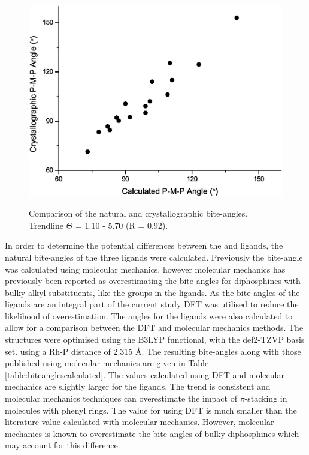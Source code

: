 \begin{figure}[htb]
\begin{center}
\vspace{0.5cm}
\includegraphics[width=\textwidth]{../Figures/Biteanglegraphorigin.eps}
\caption[Comparison of the natural and crystallographic bite-angles]{Comparison of the natural and crystallographic bite-angles.  Trendline $\Theta$ = 1.10 \natbiteangle - 5.70 (R = 0.92).}
\vspace{0.2cm}
\label{Biteanglegraph}
\end{center}
\end{figure}
\vspace{0.2cm}

In order to determine the potential differences between the \tBuxantphos{} and \Phxantphos{} ligands, the natural bite-angles of the three \tBuxantphos{} ligands were calculated.  Previously the \tBuxantphos{} bite-angle was calculated using molecular mechanics, however molecular mechanics has previously been reported as overestimating the bite-angles for diphosphines with bulky alkyl substituents, like the \tBu{} groups in the \tBuxantphos{} ligands.\cite{Dierkes1999}  As the bite-angles of the \tBuxantphos{} ligands are an integral part of the current study \gls{DFT} was utilised to reduce the likelihood of overestimation.  The angles for the \Phxantphos{} ligands were also calculated to allow for a comparison between the \gls{DFT} and molecular mechanics methods.  The structures were optimised using the B3LYP functional,\cite{Becke1993, Lee1988, Vosko1980, Stephens1994} with the def2-TZVP basis set.\cite{Andrae1990, Weigend2005} using a Rh-P distance of 2.315 \si{\angstrom}.  The resulting bite-angles along with those published using molecular mechanics are given in Table \ref{table:biteanglescalculated}.  The values calculated using DFT and molecular mechanics are slightly larger for the \Phxantphos{} ligands.  The trend is consistent and molecular mechanics techniques can overestimate the impact of $\pi$-stacking in molecules with phenyl rings.  The value for \tBuxantphos{} using DFT is much smaller than the literature value calculated with molecular mechanics.  However, molecular mechanics is known to overestimate the bite-angles of bulky diphosphines which may account for this difference.\cite{Dierkes1999}


